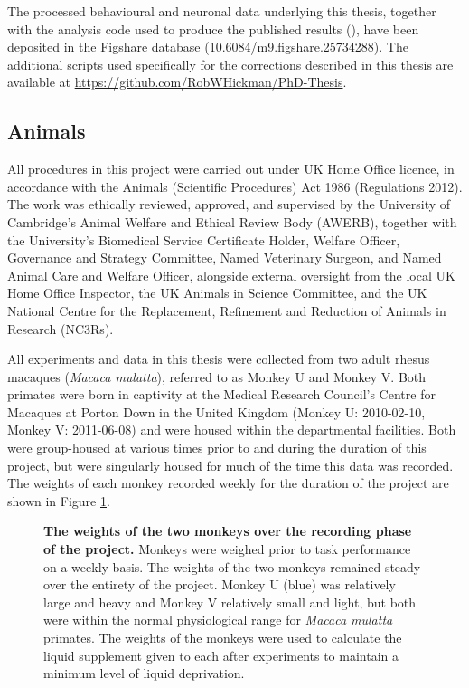 The processed behavioural and neuronal data underlying this thesis, together with the analysis code used to produce the published results (\cite{Hill2024-my}), have been deposited in the Figshare database (10.6084/m9.figshare.25734288). The additional scripts used specifically for the corrections described in this thesis are available at \url{https://github.com/RobWHickman/PhD-Thesis}.

\subsection{Animals}
All procedures in this project were carried out under UK Home Office licence, in accordance with the Animals (Scientific Procedures) Act 1986 (Regulations 2012). The work was ethically reviewed, approved, and supervised by the University of Cambridge's Animal Welfare and Ethical Review Body (AWERB), together with the University's Biomedical Service Certificate Holder, Welfare Officer, Governance and Strategy Committee, Named Veterinary Surgeon, and Named Animal Care and Welfare Officer, alongside external oversight from the local UK Home Office Inspector, the UK Animals in Science Committee, and the UK National Centre for the Replacement, Refinement and Reduction of Animals in Research (NC3Rs).

All experiments and data in this thesis were collected from two adult rhesus macaques (\textit{Macaca mulatta}), referred to as Monkey U and Monkey V. Both primates were born in captivity at the Medical Research Council’s Centre for Macaques at Porton Down in the United Kingdom (Monkey U: 2010-02-10, Monkey V: 2011-06-08) and were housed within the departmental facilities. Both were group-housed at various times prior to and during the duration of this project, but were singularly housed for much of the time this data was recorded. The weights of each monkey recorded weekly for the duration of the project are shown in Figure \ref{fig:monkey_weights}.

\begin{figure}[htbp!] 
\centering    

\caption[The weights of the two monkeys over the recording phase of the project.]{\textbf{The weights of the two monkeys over the recording phase of the project.} Monkeys were weighed prior to task performance on a weekly basis. The weights of the two monkeys remained steady over the entirety of the project. Monkey U (blue) was relatively large and heavy and Monkey V relatively small and light, but both were within the normal physiological range for \textit{Macaca mulatta} primates. The weights of the monkeys were used to calculate the liquid supplement given to each after experiments to maintain a minimum level of liquid deprivation.}
\label{fig:monkey_weights}
\end{figure}

